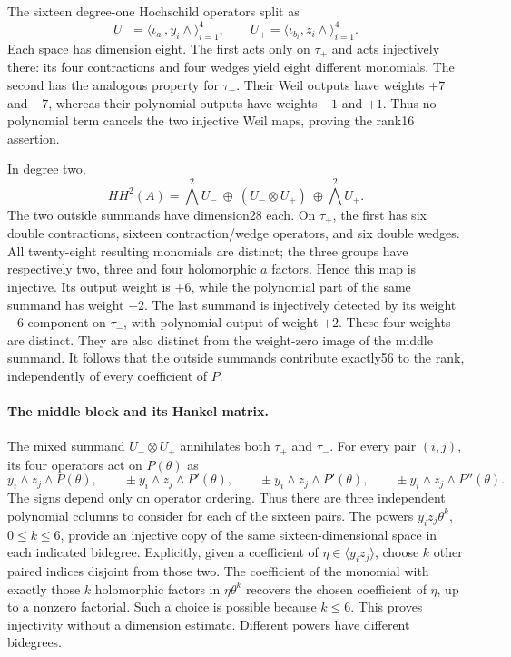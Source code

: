 The sixteen degree-one Hochschild operators split as
\[
 U_- =\langle\iota_{a_i},y_i\wedge\rangle_{i=1}^4,
 \qquad
 U_+ =\langle\iota_{b_i},z_i\wedge\rangle_{i=1}^4.
                                                               \tag{N14.4}
\]
Each space has dimension eight. The first acts only on
$\tau_+$ and acts injectively there: its four contractions
and four wedges yield eight different monomials. The second
has the analogous property for $\tau_-$. Their Weil outputs
have weights $+7$ and $-7$, whereas their polynomial outputs
have weights $-1$ and $+1$. Thus no polynomial term cancels
the two injective Weil maps, proving the rank16 assertion.

In degree two,
\[
 HH^2(A)=\bigwedge^2U_-\ \oplus\ (U_-\otimes U_+)\
                                      \oplus\bigwedge^2U_+.
                                                               \tag{N14.5}
\]
The two outside summands have dimension28 each. On $\tau_+$,
the first has six double contractions, sixteen contraction/wedge
operators, and six double wedges. All twenty-eight resulting
monomials are distinct; the three groups have respectively
two, three and four holomorphic $a$ factors. Hence this map
is injective. Its output weight is $+6$, while the polynomial
part of the same summand has weight $-2$.
The last summand is injectively detected by its weight $-6$
component on $\tau_-$, with polynomial output of weight $+2$.
These four weights are distinct. They are also distinct from
the weight-zero image of the middle summand.
It follows that the outside summands contribute exactly56
to the rank, independently of every coefficient of $P$.

\paragraph{The middle block and its Hankel matrix.}
The mixed summand $U_-\otimes U_+$ annihilates both
$\tau_+$ and $\tau_-$. For every pair $(i,j)$, its four
operators act on $P(\theta)$ as
\[
 y_i\wedge z_j\wedge P(\theta),\qquad
 \pm y_i\wedge z_j\wedge P'(\theta),\qquad
 \pm y_i\wedge z_j\wedge P'(\theta),\qquad
 \pm y_i\wedge z_j\wedge P''(\theta).                    \tag{N14.6}
\]
The signs depend only on operator ordering. Thus there are
three independent polynomial columns to consider for each
of the sixteen pairs. The powers
$y_i z_j\theta^k$, $0\le k\le6$, provide an injective copy
of the same sixteen-dimensional space in each indicated
bidegree. Explicitly, given a coefficient of
$\eta\in\langle y_i z_j\rangle$, choose $k$ other paired
indices disjoint from those two. The coefficient of the
monomial with exactly those $k$ holomorphic factors in
$\eta\theta^k$ recovers the chosen coefficient of $\eta$,
up to a nonzero factorial. Such a choice is possible because
$k\le6$. This proves injectivity without a dimension estimate.
Different powers have different bidegrees.

